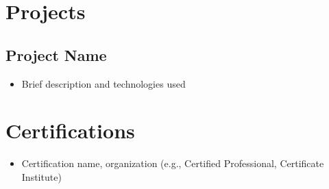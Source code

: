 \documentclass[a4paper,10pt]{article}
\begin{document}
\section*{Projects}
\subsection*{Project Name}
\begin{itemize}
    \item Brief description and technologies used
\end{itemize}

\section*{Certifications}
\begin{itemize}
    \item Certification name, organization (e.g., Certified Professional, Certificate Institute)
\end{itemize}
\end{document}
